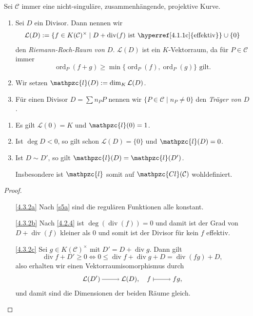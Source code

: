 \documentclass[a4paper,12pt,index=toc]{scrbook}
\theoremstyle{keinenummern} %
\def\CC{\mathcal{C}}
\newcommand{\Cl}{\mathpzc{Cl}}
\renewcommand{\L}{\mathcal{L}}
\def\ll{\mathpzc{l}}
\renewcommand{\div}{\operatorname{div}}
\newcommand{\ord}{\operatorname{ord}}
\begin{document}
Sei $\CC$ immer eine nicht-singuläre, zusammenhängende, projektive Kurve.

\begin{db}\label{4.3.1}
\begin{enumerate}
\item{} Sei $D$ ein Divisor. Dann nennen wir
\[\L(D):=\{f\in K(\CC)^{\times}\mid D+\div(f)\text{ ist \hyperref[4.1.1c]{effektiv}}\}\cup\{0\}\]
den \emph{Riemann-Roch-Raum von $D$}. $\L(D)$ ist ein $K$-Vektorraum, da für $P\in\CC$ immer
\[\ord_{P}(f+g)\geq\min\{\ord_{P}(f),\ord_{P}(g)\}\text{ gilt.}\]
\item{} Wir setzen $\ll(D):=\dim_{K}\L(D)$.
\item{} Für einen Divisor $D=\sum n_{P} P$ nennen wir $\{P\in\CC\mid n_{P}\neq 0\}$ den \emph{Träger von $D$}.
\end{enumerate}\end{db}

\begin{bem}\label{4.3.2}
\begin{enumerate}
\item{} Es gilt $\L(0)=K$ und $\ll(0)=1$.
\item{} Ist $\deg D<0$, so gilt schon $\L(D)=\{0\}$ und $\ll(D)=0$.
\item{} Ist $D\sim D'$, so gilt $\ll(D)=\ll(D')$.

Insbesondere ist $\ll$ somit auf $\Cl(\CC)$ wohldefiniert.
\end{enumerate}\end{bem}

\begin{proof}\begin{enumerate}
\item[\ref{4.3.2a}] Nach \cref{s5a} sind die regulären Funktionen alle konstant.
\item[\ref{4.3.2b}] Nach \cref{4.2.4} ist $\deg(\div (f))=0$ und damit ist der Grad von $D+\div(f)$ kleiner als $0$ und somit ist der Divisor für kein $f$ effektiv.
\item[\ref{4.3.2c}] Sei $g\in K(\CC)^{\times}$ mit $D'=D+\div g$. Dann gilt
\[\div f+D'\geq 0\iff 0\leq \div f+\div g+D=\div(fg)+D,\]
also erhalten wir einen Vektorraumisomorphismus durch
\[\L(D')\ra\L(D),\quad f\mapsto fg,\]
und damit sind die Dimensionen der beiden Räume gleich.
\end{enumerate}\end{proof}
\end{document}
